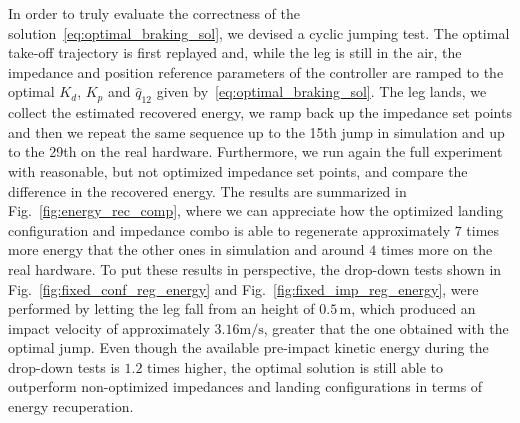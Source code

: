 In order to truly evaluate the correctness of the solution~\eqref{eq:optimal_braking_sol}, we devised a cyclic jumping test. The optimal take-off trajectory is first replayed and, while the leg is still in the air, the impedance and position reference parameters of the controller are ramped to the optimal $K_d$, $K_p$ and $\hat{q}_{12}$ given by~\eqref{eq:optimal_braking_sol}. The leg lands, we collect the estimated recovered energy, we ramp back up the impedance set points and then we repeat the same sequence up to the 15th jump in simulation and up to the 29th on the real hardware. Furthermore, we run again the full experiment with reasonable, but not optimized impedance set points, and compare the difference in the recovered energy. The results are summarized in Fig.~\ref{fig:energy_rec_comp}, where we can appreciate how the optimized landing configuration and impedance combo is able to regenerate approximately $7$ times more energy that the other ones in simulation and around $4$ times more on the real hardware. To put these results in perspective, the drop-down tests shown in Fig.~\ref{fig:fixed_conf_reg_energy} and Fig.~\ref{fig:fixed_imp_reg_energy}, were performed by letting the leg fall from an height of $0.5\,\mathrm{m}$, which produced an impact velocity of approximately $3.16\mathrm{m/s}$, greater that the one obtained with the optimal jump. Even though the available pre-impact kinetic energy during the drop-down tests is $1.2$ times higher, the optimal solution is still able to outperform non-optimized impedances and landing configurations in terms of energy recuperation.